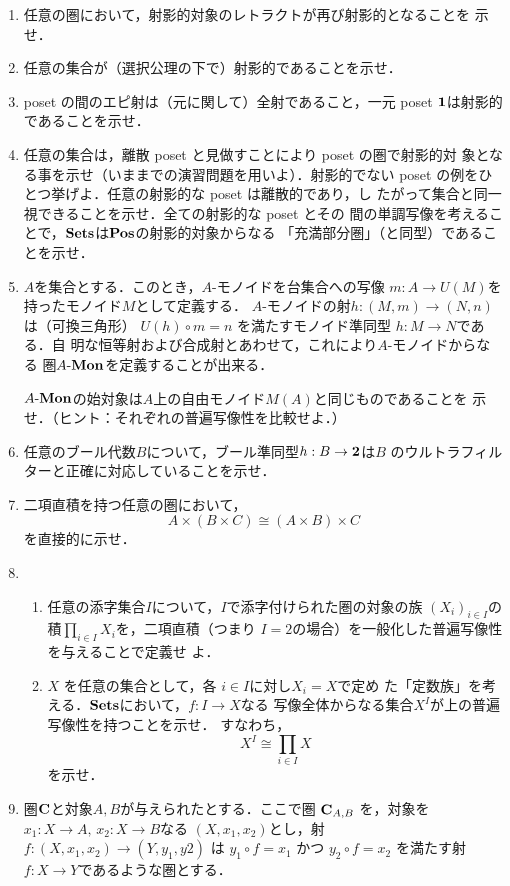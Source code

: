 \begin{enumerate}
 \item 任意の圏において，射影的対象のレトラクトが再び射影的となることを
       示せ．
 \item 任意の集合が（選択公理の下で）射影的であることを示せ．
 \item poset の間のエピ射は（元に関して）全射であること，一元 poset
       ${\bf 1}$は射影的であることを示せ．
 \item 任意の集合は，離散 poset と見做すことにより poset の圏で射影的対
       象となる事を示せ（いままでの演習問題を用いよ）．射影的でない
       poset の例をひとつ挙げよ．任意の射影的な poset は離散的であり，し
       たがって集合と同一視できることを示せ．全ての射影的な poset とその
       間の単調写像を考えることで，$\mathbf{Sets}$は$\mathbf{Pos}$の射影的対象からなる
       「充満部分圏」（と同型）であることを示せ．
 \item $A$を集合とする．このとき，$A$-モノイドを台集合への写像
       $m: A \to U(M)$を持ったモノイド$M$として定義する．
       $A$-モノイドの射$h: (M, m) \to (N, n)$は（可換三角形）
       $U(h) \circ m = n$ を満たすモノイド準同型 $h: M \to N$である．自
       明な恒等射および合成射とあわせて，これにより$A$-モノイドからなる
       圏$A\dash\Mon$を定義することが出来る．

       $A\dash\Mon$の始対象は$A$上の自由モノイド$M(A)$と同じものであることを
       示せ．（ヒント：それぞれの普遍写像性を比較せよ．）
 \item 任意のブール代数$B$について，ブール準同型$h: B \to {\bf 2}$は$B$
       のウルトラフィルターと正確に対応していることを示せ．
 \item 二項直積を持つ任意の圏において，
       \[
	A \times (B \times C) \cong (A \times B) \times C
       \]
       を直接的に示せ．
 \item \begin{enumerate}
	\item 任意の添字集合$I$について，$I$で添字付けられた圏の対象の族
	$(X_i)_{i \in I}$の積$\prod_{i\in I} X_i$を，二項直積（つまり
	      $I = 2$の場合）を一般化した普遍写像性を与えることで定義せ
	      よ．
	\item $X$ を任意の集合として，各 $i \in I$に対し$X_i = X$で定め
	      た「定数族」を考える．$\mathbf{Sets}$において，$f: I \to X$なる
	      写像全体からなる集合$X^I$が上の普遍写像性を持つことを示せ．
	      すなわち，
	      \[
	       X^I \cong \prod_{i \in I} X
	      \]
	      を示せ．
       \end{enumerate}
 \item 圏${\bf C}$と対象$A, B$が与えられたとする．ここで圏
       ${\bf C}_{A, B}$ を，対象を$x_1 : X \to A,\, x_2 : X \to B$なる
       $(X, x_1, x_2)$とし，射$f: (X, x_1, x_2) \to (Y, y_1, y2)$
       は $y_1 \circ f = x_1$ かつ $y_2 \circ f = x_2$ を満たす射
       $f: X \to Y$であるような圏とする．


\end{enumerate}

